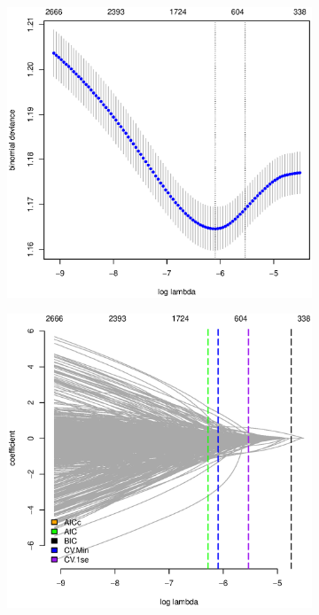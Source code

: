\documentclass[11pt, fleqn]{article}
\begin{document}
\begin{figure}
  \centering
  \begin{subfigure}[b]{0.49\textwidth}
    \includegraphics[width=\textwidth]{cv_nhl_gamlr_a.eps}
    \caption{}
    \label{fig:cv_nhl}
  \end{subfigure}
  \hfill
  \begin{subfigure}[b]{0.49\textwidth}
    \includegraphics[width=\textwidth]{ic_nhl_c.eps}
    \caption{}
    \label{fig:ic_nhl}
  \end{subfigure}
  \caption{}
\end{figure}
\end{document}
